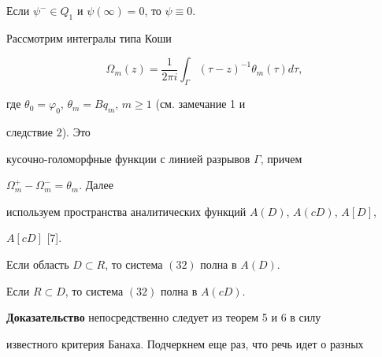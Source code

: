  


 


\begin{cor} 


Если $\psi^-\in Q_1$ и $\psi(\infty)=0$, то $\psi\equiv0$. 


\end{cor} 


 


 


Рассмотрим интегралы типа Коши 


\begin{equation} 


\Omega_m(z)=\frac{1}{2\pi i}\int_\Gamma(\tau-z)^{-1} 


\theta_m(\tau)d\tau, 


\end{equation} 


где $\theta_0=\varphi_0$, $\theta_m=Bq_m$, $m\ge1$ (см. замечание 1 и 


следствие 2). Это 


кусочно-голоморфные функции с линией разрывов $\Gamma$, причем 


$\Omega^+_m-\Omega^-_m=\theta_m$. Далее 


используем пространства аналитических функций $A(D)$, $A(cD)$, $A[D]$, 


$A[cD]$ [7]. 


 


 


\begin{thm} 


Если область $D\subset R$, то система $(32)$ полна в $A(D)$. 


\end{thm} 


 


 


\begin{thm} 


Если $R\subset D$, то система $(32)$ полна в $A(cD)$. 


\end{thm} 


 


 


{\bf Доказательство} непосредственно следует из теорем 5 и 6 в силу 


известного критерия Банаха. Подчеркнем еще раз, что речь идет о разных 


